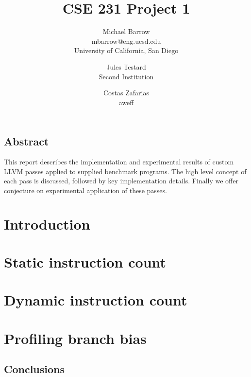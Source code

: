 \documentclass[letterpaper,twocolumn,10pt]{article}
\begin{document}
\date{}

\title{\Large \bf CSE 231 Project 1}

\author{
{\rm Michael Barrow}\\
mbarrow@eng.ucsd.edu\\
University of California, San Diego
\and
{\rm Jules Testard}\\
Second Institution
\and
{Costas Zafarias}\\
aweff
}

\maketitle

\thispagestyle{empty}


\subsection*{Abstract}
This report describes the implementation and experimental results of custom LLVM passes applied to supplied benchmark programs. The high level concept of each pass is discussed, followed by key implementation details. Finally we offer conjecture on experimental application of these passes. %

\section{Introduction}


 
\section{Static instruction count}



\section{Dynamic instruction count}



\section{Profiling branch bias}



\subsection{Conclusions}



{\footnotesize 
}

\theendnotes
\end{document}
